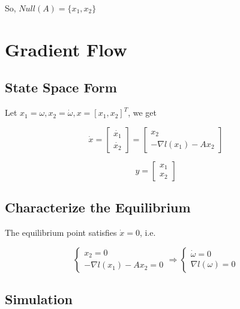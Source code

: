 \documentclass[titlepage]{article}
\begin{document}
So, $Null(A)=\{x_1,x_2\}$

\section{Gradient Flow}

\subsection{State Space Form}

Let $x_1=\omega, x_2=\dot{\omega}, x=[x_1,x_2]^T$, we get

\begin{equation}
    \dot{x}=
    \begin{bmatrix}
        \dot{x_1}\\\dot{x_2}
    \end{bmatrix}
    =\begin{bmatrix}
        x_2\\-\nabla l(x_1)-Ax_2
    \end{bmatrix}
\end{equation}

\begin{equation}
    y=
    \begin{bmatrix}
        x_1\\x_2
    \end{bmatrix}
\end{equation}

\subsection{Characterize the Equilibrium}

The equilibrium point satisfies $\dot{x}=0$, i.e.

\begin{equation}
    \begin{cases}
        x_2=0\\
        -\nabla l(x_1)-Ax_2=0
    \end{cases}
    \Rightarrow
    \begin{cases}
        \dot{\omega}=0\\
        \nabla l(\omega)=0
    \end{cases}
\end{equation}

\subsection{Simulation}
\end{document}
